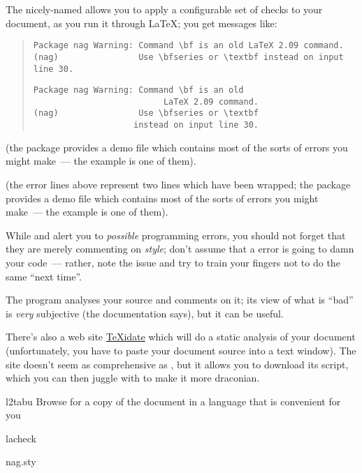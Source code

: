 The nicely-named  allows you to apply a configurable set
of checks to your document, as you run it through \LaTeX{}; you get
messages like:
\begin{quote}
\begin{wideversion}
\begin{verbatim}
Package nag Warning: Command \bf is an old LaTeX 2.09 command. 
(nag)                Use \bfseries or \textbf instead on input line 30.
\end{verbatim}
\end{wideversion}
\begin{narrowversion}
\begin{verbatim}
Package nag Warning: Command \bf is an old
                          LaTeX 2.09 command. 
(nag)                Use \bfseries or \textbf
                    instead on input line 30.
\end{verbatim}
\end{narrowversion}
\end{quote}
\begin{wideversion}
  (the package provides a demo file which contains most of the sorts
  of errors you might make~--- the example is one of them).
\end{wideversion}
\begin{narrowversion}
  (the error lines above represent two lines which have been wrapped;
  the package provides a demo file which contains most of the sorts of
  errors you might make~--- the example is one of them).
\end{narrowversion}
While  and  alert you to \emph{possible}
programming errors, you should not forget that they are merely
commenting on \emph{style}; don't assume that a  error is
going to damn your code~--- rather, note the issue and try to train
your fingers not to do the same ``next time''.

The  program analyses your source and comments on
it; its view of what is ``bad'' is \emph{very} subjective (the
documentation says), but it can be useful.

There's also a web site
\href{http://www.kohm.name/markus/texidate.html}{TeXidate}
which will do a static analysis of your document (unfortunately, you
have to paste your document source into a text window).  The site
doesn't seem as comprehensive as , but it allows you to
download its script, which you can then juggle with to make it more
draconian.
\begin{ctanrefs}
\item[l2tabu]Browse  for a copy of the document in a
  language that is convenient for you
\item[lacheck]
\item[nag.sty]
\end{ctanrefs}


